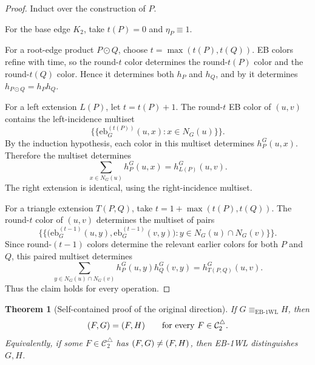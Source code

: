 \documentclass[11pt]{article}
\newtheorem{theorem}{Theorem}[section]
\let\hom\relax
\DeclareMathOperator{\hom}{hom}
\newcommand{\cC}{\mathcal{C}}
\newcommand{\mset}[1]{\{\!\{#1\}\!\}}
\begin{document}
\begin{proof}
Induct over the construction of $P$.

For the base edge $K_2$, take $t(P)=0$ and $\eta_P\equiv 1$.

For a root-edge product $P\odot Q$, choose $t=\max(t(P),t(Q))$.  EB colors refine with time, so the round-$t$ color determines the round-$t(P)$ color and the round-$t(Q)$ color.  Hence it determines both $h_P$ and $h_Q$, and by  it determines $h_{P\odot Q}=h_P h_Q$.

For a left extension $L(P)$, let $t=t(P)+1$.  The round-$t$ EB color of $(u,v)$ contains the left-incidence multiset
\[
\mset{\mathrm{eb}^{(t(P))}_G(u,x):x\in N_G(u)}.
\]
By the induction hypothesis, each color in this multiset determines $h_P^G(u,x)$.  Therefore the multiset determines
\[
\sum_{x\in N_G(u)}h_P^G(u,x)=h_{L(P)}^G(u,v).
\]
The right extension is identical, using the right-incidence multiset.

For a triangle extension $T(P,Q)$, take $t=1+\max(t(P),t(Q))$.  The round-$t$ color of $(u,v)$ determines the multiset of pairs
\[
\mset{\bigl(\mathrm{eb}^{(t-1)}_G(u,y),\mathrm{eb}^{(t-1)}_G(v,y)\bigr):y\in N_G(u)\cap N_G(v)}.
\]
Since round-$(t-1)$ colors determine the relevant earlier colors for both $P$ and $Q$, this paired multiset determines
\[
\sum_{y\in N_G(u)\cap N_G(v)}h_P^G(u,y)h_Q^G(v,y)
=h_{T(P,Q)}^G(u,v).
\]
Thus the claim holds for every operation.
\end{proof}

\begin{theorem}[Self-contained proof of the original direction]
\label{thm:original-direction-self-contained}
If $G\equiv_{\mathrm{EB\text{-}1WL}}H$, then
\[
\hom(F,G)=\hom(F,H)
\qquad\text{for every }F\in\cC_2^\triangle.
\]
Equivalently, if some $F\in\cC_2^\triangle$ has $\hom(F,G)\neq\hom(F,H)$, then EB-1WL distinguishes $G,H$.
\end{theorem}
\end{document}

